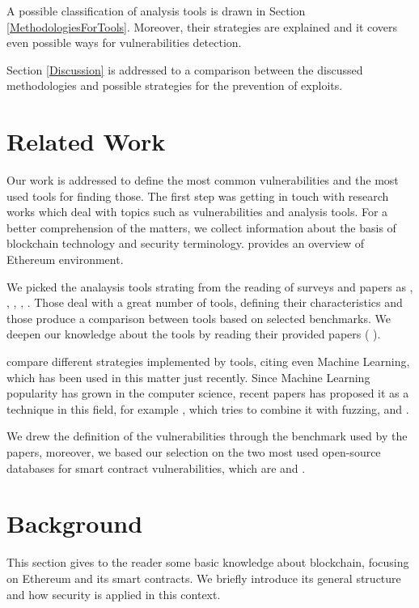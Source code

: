 \documentclass[a4paper,sigconf, language=french,
language=german, language=spanish, language=english]{acmart}
\begin{document}
A possible classification of analysis tools is drawn in Section \ref{MethodologiesForTools}. Moreover, their strategies are explained and it covers even possible ways for vulnerabilities detection.

Section \ref{Discussion} is addressed to a comparison between the discussed methodologies and possible strategies for the prevention of exploits.



\section{Related Work}
\label{RelatedWork}
Our work is addressed to define the most common vulnerabilities and the most used tools for finding those.
The first step was getting in touch with research works which deal with topics such as vulnerabilities and analysis tools. For a better comprehension of the matters, we collect information about the basis of blockchain technology and security terminology. \cite{ETHfoundation} provides an overview of Ethereum environment. 

We picked the analaysis tools strating from the reading of surveys and papers as \cite{SurvTools}, \cite{Thesis}, \cite{AutomaticTools}, \cite{AttacksAndProtection}, \cite{ToolsAndVuln}. 
Those deal with a great number of tools, defining their characteristics and those produce a comparison between tools based on selected benchmarks. We deepen our knowledge about the tools by reading their provided papers
(\cite{Slither} \cite{Echidna} \cite{Manticore} \cite{SmartTest} \cite{Oyente}). 

\cite{Methodologies} compare different strategies implemented by tools, citing even Machine Learning, which has been used in this matter just recently.
Since Machine Learning popularity has grown in the computer science, recent papers has proposed it as a technique in this field, for example \cite{FuzzML}, which tries to combine it with fuzzing, and \cite{MLSmartContractPropose}. 

We drew the definition of the vulnerabilities through the benchmark used by the papers, moreover, we based our selection on the two most used open-source databases for smart contract vulnerabilities, which are \cite{SWC} and \cite{DASP10}.

\section{Background}
\label{Background}
This section gives to the reader some basic knowledge about blockchain, focusing on Ethereum and its smart contracts. We briefly introduce its general structure and how security is applied in this context.
\end{document}
